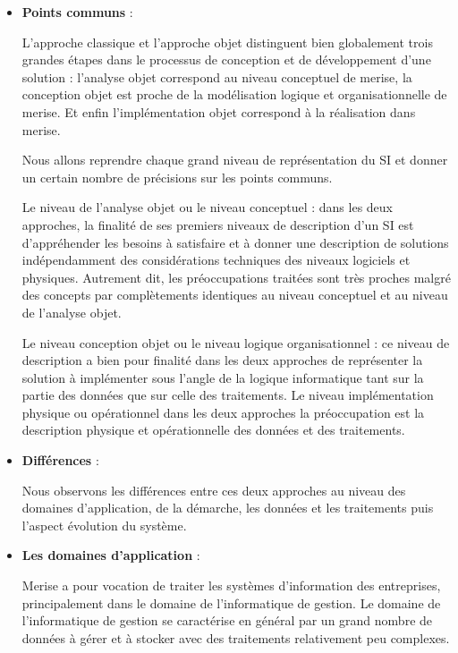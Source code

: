 \vspace{1em}
\begin{itemize}
	\setlength\itemsep{1em}
	\item \textbf{Points communs} :

	      L’approche classique et l’approche objet distinguent bien globalement trois grandes étapes dans le processus de conception et de développement d’une solution : l’analyse objet correspond au niveau conceptuel de merise, la conception objet est proche de la modélisation logique et organisationnelle de merise.
	      Et enfin l’implémentation objet correspond à la réalisation dans merise.

	      Nous allons reprendre chaque grand niveau de représentation du SI et donner un certain nombre
	      de précisions sur les points communs.

	      Le niveau de l’analyse objet ou le niveau conceptuel : dans les deux approches, la finalité de ses premiers niveaux de description d’un SI est d’appréhender les besoins à satisfaire et à donner une description de solutions indépendamment des considérations techniques des niveaux logiciels et physiques. Autrement dit, les préoccupations traitées sont très proches malgré des concepts par complètements identiques au niveau conceptuel et au niveau de l’analyse objet.

	      Le niveau conception objet ou le niveau logique organisationnel : ce niveau de description a bien pour finalité dans les deux approches de représenter la solution à implémenter sous l’angle de la logique informatique tant sur la partie des données que sur celle des traitements. Le niveau implémentation physique ou opérationnel dans les deux approches la préoccupation est la description physique et opérationnelle des données et des traitements.

	\item \textbf{Différences} :

	      Nous observons les différences entre ces deux approches au niveau des domaines d’application,
	      de la démarche, les données et les traitements puis l’aspect évolution du système.

	\item \textbf{Les domaines d’application} :

	      Merise a pour vocation de traiter les systèmes d’information des entreprises, principalement dans le domaine de l’informatique de gestion. Le domaine de l’informatique de gestion se caractérise en général par un grand nombre de données à gérer et à stocker avec des traitements relativement peu complexes.


\end{itemize}
